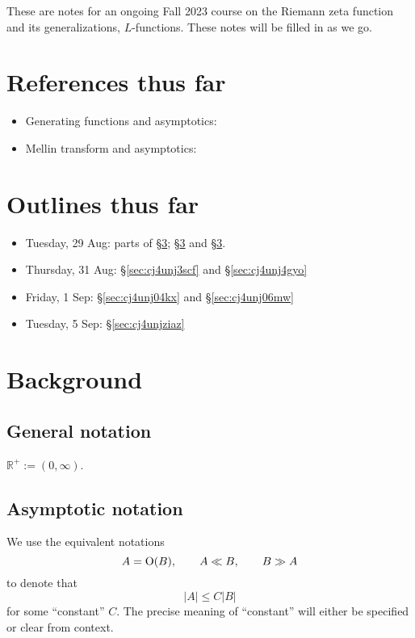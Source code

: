 \documentclass[reqno]{amsart}  \numberwithin{theorem}{section} \numberwithin{equation}{section}
\begin{document}
These are notes for an ongoing Fall 2023 course on the Riemann zeta function and its generalizations, $L$-functions.  These notes will be filled in as we go.

\section{References thus far}
\begin{itemize}
\item Generating functions and asymptotics: \cite[\S5.2]{MR2172781}
\item Mellin transform and asymptotics: \cite{zagier-mellin}
\end{itemize}

\section{Outlines thus far}
\begin{itemize}
\item Tuesday, 29 Aug: parts of \S\ref{sec:cj4unj5r3k}; \S\ref{sec:cj4unj5r3k} and \S\ref{sec:cj4unj5r3k}.
\item Thursday, 31 Aug: \S\ref{sec:cj4unj3scf} and \S\ref{sec:cj4unj4gyo}
\item Friday, 1 Sep: \S\ref{sec:cj4unj04kx} and \S\ref{sec:cj4unj06mw}
\item Tuesday, 5 Sep: \S\ref{sec:cj4unjziaz}
\end{itemize}


\newpage


\section{Background}\label{sec:cj4unj5r3k}

\subsection{General notation}
$\mathbb{R}^+ := (0,\infty)$.

\subsection{Asymptotic notation}
We use the equivalent notations
\begin{equation*}
  A = \operatorname{O}(B), \qquad A \ll B,
  \qquad B \gg A
\end{equation*}
to denote that
\begin{equation*}
  \lvert A \rvert \leq C \lvert B \rvert
\end{equation*}
for some ``constant'' $C$.  The precise meaning of ``constant'' will either be specified or clear from context.
\end{document}
